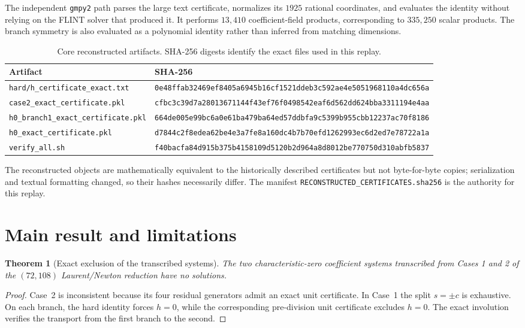 \documentclass[11pt,a4paper]{article}
\newtheorem{theorem}{Theorem}[section]
\theoremstyle{remark}
\begin{document}
The independent \texttt{gmpy2} path parses the large text certificate, normalizes its $1925$ rational coordinates, and evaluates the identity without relying on the FLINT solver that produced it. It performs $13{,}410$ coefficient-field products, corresponding to $335{,}250$ scalar products. The branch symmetry is also evaluated as a polynomial identity rather than inferred from matching dimensions.

\begin{table}[ht]
\centering
\caption{Core reconstructed artifacts. SHA-256 digests identify the exact files used in this replay.}
\scriptsize
\begin{tabularx}{\textwidth}{@{}>{\raggedright\arraybackslash}p{}>{\raggedright\arraybackslash}X@{}}
\toprule
Artifact & SHA-256 \\
\midrule
\texttt{hard/h\_certificate\_exact.txt} & \texttt{0e48ffab32469ef8405a6945b16cf1521ddeb3c592ae4e5051968110a4dc656a} \\
\texttt{case2\_exact\_certificate.pkl} & \texttt{cfbc3c39d7a28013671144f43ef76f0498542eaf6d562dd624bba3311194e4aa} \\
\texttt{h0\_branch1\_exact\_certificate.pkl} & \texttt{664de005e99bc6a0e61ba479ba64ed57ddbfa9c5399b955cbb12237ac70f8186} \\
\texttt{h0\_exact\_certificate.pkl} & \texttt{d7844c2f8edea62be4e3a7fe8a160dc4b7b70efd1262993ec6d2ed7e78722a1a} \\
\texttt{verify\_all.sh} & \texttt{f40bacfa84d915b375b4158109d5120b2d964a8d8012be770750d310abfb5837} \\
\bottomrule
\end{tabularx}
\end{table}

The reconstructed objects are mathematically equivalent to the historically described certificates but not byte-for-byte copies; serialization and textual formatting changed, so their hashes necessarily differ. The manifest \texttt{RECONSTRUCTED\_CERTIFICATES.sha256} is the authority for this replay.

\section{Main result and limitations}

\begin{theorem}[Exact exclusion of the transcribed systems]
The two characteristic-zero coefficient systems transcribed from Cases 1 and 2 of the $(72,108)$ Laurent/Newton reduction have no solutions.
\end{theorem}
\begin{proof}
Case~2 is inconsistent because its four residual generators admit an exact unit certificate. In Case~1 the split $s=\pm c$ is exhaustive. On each branch, the hard identity forces $h=0$, while the corresponding pre-division unit certificate excludes $h=0$. The exact involution verifies the transport from the first branch to the second.
\end{proof}
\end{document}
